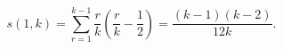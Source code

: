 $$
s(1, k) = \sum_{r=1}^{k-1} \frac{r}{k} \left( \frac{r}{k} - \frac{1}{2} \right) = \frac{(k-1)(k-2)}{12k}.
$$
